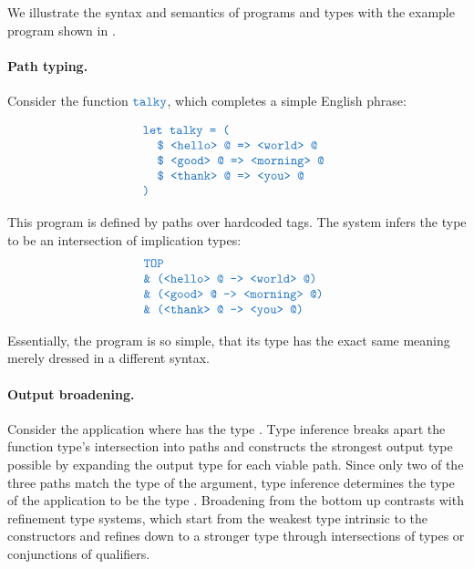 \documentclass[acmsmall]{acmart}
\theoremstyle{definition}
\begin{document}

We illustrate the syntax and semantics of programs and types with the example program shown in .

\paragraph{Path typing.}
Consider the function $\obj{talky}$, which completes a simple English phrase:

\[
  \begin{array}[t]{@{} l}
    \obj{let talky = (}
      \\
      \I \obj{\$ <hello> @ => <world> @}
      \\
      \I \obj{\$ <good> @ => <morning> @} 
      \\
      \I \obj{\$ <thank> @ => <you> @} 
      \\
    \obj{)}
  \end{array}
\]

This program is defined by paths over hardcoded tags.
The system infers the type to be an intersection of implication types:
\[
  \begin{array}[t]{@{} l}
    \obj{TOP}
    \\
    \obj{\& (<hello> @ -> <world> @)}
    \\
    \obj{\& (<good> @ -> <morning> @)} 
    \\
    \obj{\& (<thank> @ -> <you> @)}
  \end{array}
\]

Essentially, the program is so simple, that its type has the exact same meaning merely dressed in a different syntax.

\paragraph{Output broadening.}
Consider the application  where  has the type . 
Type inference breaks apart the function type's intersection into paths and 
constructs the strongest output type possible by expanding the output type
for each viable path. Since only two of the three paths 
match the type of the argument, type inference determines the type of the application to be the type 
.
Broadening from the bottom up contrasts with refinement type systems, which start from
the weakest type intrinsic to the constructors and refines down to a stronger type
through intersections of types or conjunctions of qualifiers.
\end{document}
